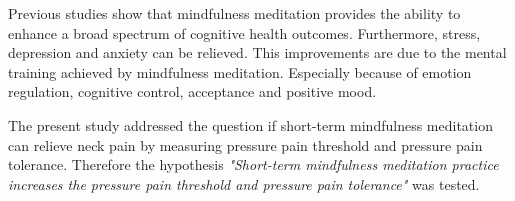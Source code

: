Previous studies show that mindfulness meditation provides the ability to enhance a broad spectrum of cognitive health outcomes. Furthermore, stress, depression and anxiety can be relieved. This improvements are due to the mental training achieved by mindfulness meditation. Especially because of emotion regulation, cognitive control, acceptance and positive mood. \cite{Zeidan2012,Zeidan2016} 

The present study addressed the question if short-term mindfulness meditation can relieve neck pain by measuring pressure pain threshold and pressure pain tolerance. Therefore the hypothesis  \textit{"Short-term mindfulness meditation practice increases the pressure pain threshold and pressure pain tolerance"} was tested.

